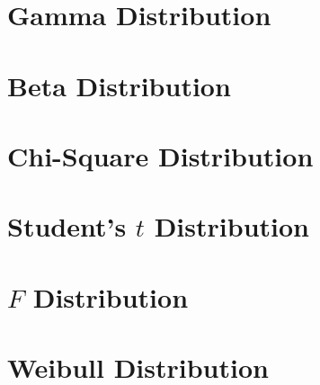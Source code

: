 \section{Gamma Distribution}

\section{Beta Distribution}

\section{Chi-Square Distribution}

\section{Student's $t$ Distribution}

\section{$F$ Distribution}

\section{Weibull Distribution} 